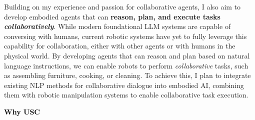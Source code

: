 \documentclass[10pt]{article}
\newcommand{\statement}[1]{\medskip\noindent
  \textcolor{black}{\textbf{#1}}\space
}
\begin{document}
\noindent Building on my experience and passion for collaborative agents, I also aim to develop embodied agents that can \textbf{reason, plan, and execute tasks \textit{collaboratively}}. While modern foundational LLM systems are capable of conversing with humans, current robotic systems have yet to fully leverage this capability for collaboration, either with other agents or with humans in the physical world. By developing agents that can reason and plan based on natural language instructions, we can enable robots to perform \textit{collaborative} tasks, such as assembling furniture, cooking, or cleaning. To achieve this, I plan to integrate existing NLP methods for collaborative dialogue into embodied AI, combining them with robotic manipulation systems to enable collaborative task execution.

\statement{Why USC}
\end{document}
